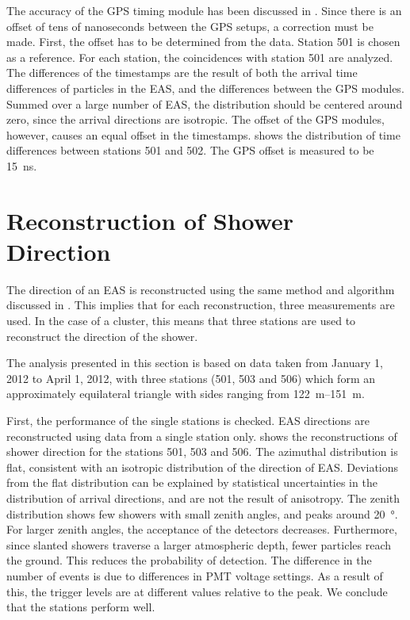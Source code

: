 The accuracy of the GPS timing module has been discussed in
.  Since there is an offset of tens of nanoseconds
between the GPS setups, a correction must be made.  First, the offset has to be
determined from the data.  Station 501 is chosen as a reference.  For each
station, the coincidences with station 501 are analyzed.  The differences of the
timestamps are the result of both the arrival time differences of particles in
the EAS, and the differences between the GPS modules.  Summed over a large
number of EAS, the distribution should be centered around zero, since the
arrival directions are isotropic.  The offset of the GPS modules, however,
causes an equal offset in the timestamps.
 shows the distribution of time
differences between stations 501 and 502.  The GPS offset is measured to be
\SI{15}{\nano\second}.


\section{Reconstruction of Shower Direction}

The direction of an EAS is reconstructed using the same method and algorithm
discussed in .  This implies that
for each reconstruction, three measurements are used.  In the case of a cluster,
this means that three stations are used to reconstruct the direction of the
shower.

The analysis presented in this section is based on data taken from January 1,
2012 to April 1, 2012, with three stations (501, 503 and 506) which form an
approximately equilateral triangle with sides ranging from
\SIrange{122}{151}{\meter}.

First, the performance of the single stations is checked. EAS directions are
reconstructed using data from a single station only.
 shows the reconstructions of shower direction
for the stations 501, 503 and 506.  The azimuthal distribution is flat,
consistent with an isotropic distribution of the direction of EAS.
Deviations from the flat distribution can be explained by statistical
uncertainties in the distribution of arrival directions, and are not the result
of anisotropy.
The zenith distribution shows few showers with small zenith angles, and peaks
around \SI{20}{\degree}.  For larger zenith angles, the acceptance of the
detectors decreases.  Furthermore, since slanted showers traverse a larger
atmospheric depth, fewer particles reach the ground.  This reduces the
probability of detection. The difference in the number of events is due to
differences in PMT voltage settings. As a result of this, the trigger levels are
at different values relative to the \mip peak. We conclude that the stations
perform well.

